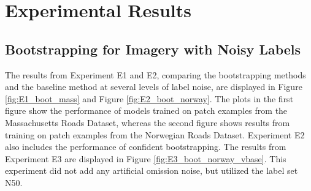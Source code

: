 \section{Experimental Results}
\label{sec:experimentalResults}
\subsection{Bootstrapping for Imagery with Noisy Labels}
\label{sec:results_bootstrapping}
The results from Experiment E1 and E2, comparing the bootstrapping methods and the baseline method at several levels of label noise, are displayed in Figure \ref{fig:E1_boot_mass} and Figure \ref{fig:E2_boot_norway}. The plots in the first figure show the performance of models trained on patch examples from the Massachusetts Roads Dataset, whereas the second figure shows results from training on patch examples from the Norwegian Roads Dataset. Experiment E2 also includes the performance of confident bootstrapping. The results from Experiment E3 are displayed in Figure \ref{fig:E3_boot_norway_vbase}. This experiment did not add any artificial omission noise, but utilized the label set N50.\\

